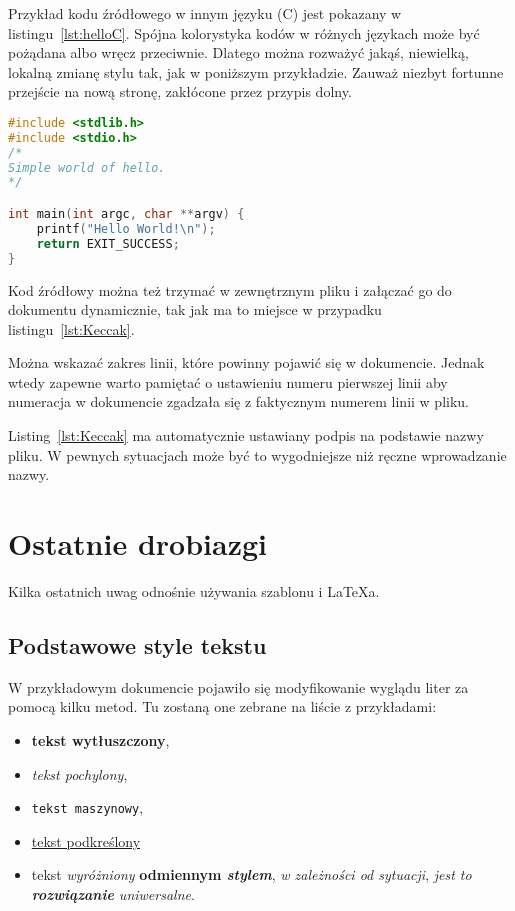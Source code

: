 Przykład kodu źródłowego w innym języku (C) jest pokazany w listingu~\ref{lst:helloC}. Spójna kolorystyka kodów w różnych językach może być pożądana albo wręcz przeciwnie. Dlatego można rozważyć jakąś, niewielką, lokalną zmianę stylu tak, jak w poniższym przykładzie. Zauważ niezbyt fortunne przejście na nową stronę, zakłócone przez przypis dolny.

\begin{lstlisting}[language=C,
    backgroundcolor=\color{EEGold!5!white},
    caption={Prosty program w języku C},
    label={lst:helloC}]
#include <stdlib.h>
#include <stdio.h>
/*
Simple world of hello.
*/

int main(int argc, char **argv) {
	printf("Hello World!\n");
	return EXIT_SUCCESS;
}
\end{lstlisting}

Kod źródłowy można też trzymać w zewnętrznym pliku i załączać go do dokumentu dynamicznie, tak jak ma to miejsce w przypadku listingu~\ref{lst:Keccak}.

Można wskazać zakres linii, które powinny pojawić się w dokumencie. Jednak wtedy zapewne warto pamiętać o ustawieniu numeru pierwszej linii aby numeracja w dokumencie zgadzała się z faktycznym numerem linii w pliku.

Listing~\ref{lst:Keccak} ma automatycznie ustawiany podpis na podstawie nazwy pliku. W pewnych sytuacjach może być to wygodniejsze niż ręczne wprowadzanie nazwy.



\section{Ostatnie drobiazgi}
Kilka ostatnich uwag odnośnie używania szablonu i \LaTeX{a}.

\subsection{Podstawowe style tekstu}
W przykładowym dokumencie pojawiło się modyfikowanie wyglądu liter za pomocą kilku metod. Tu zostaną one zebrane na liście z przykładami:
\begin{itemize}
	\item \textbf{tekst wytłuszczony},
	\item \textit{tekst pochylony},
	\item \texttt{tekst maszynowy},
	\item \underline{tekst podkreślony}
	\item tekst \emph{wyróżniony} \textbf{odmiennym \emph{stylem}}, \textit{w zależności \emph{od sytuacji}}, \emph{jest to \textbf{rozwiązanie} \textit{uniwersalne}}.
\end{itemize}

